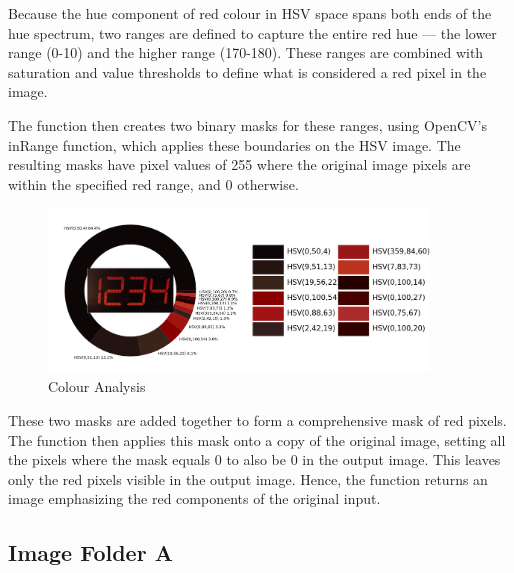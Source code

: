 Because the hue component of red colour in HSV space spans both ends of the hue spectrum, two ranges are defined to capture the entire red hue — the lower range (0-10) and the higher range (170-180). These ranges are combined with saturation and value thresholds to define what is considered a red pixel in the image.

The function then creates two binary masks for these ranges, using OpenCV's inRange function, which applies these boundaries on the HSV image. The resulting masks have pixel values of 255 where the original image pixels are within the specified red range, and 0 otherwise.

\begin{figure}[ht]
    \centering
    \includegraphics[width=0.9\textwidth]{Figures/Methodology/sipa_02/red_analysis.png}
    \caption[Colour Analysis]{Colour Analysis}
    \label{fig:Colour Analysis}
\end{figure}


These two masks are added together to form a comprehensive mask of red pixels. The function then applies this mask onto a copy of the original image, setting all the pixels where the mask equals 0 to also be 0 in the output image. This leaves only the red pixels visible in the output image. Hence, the function returns an image emphasizing the red components of the original input.


\newpage

\subsection{Image Folder A}

